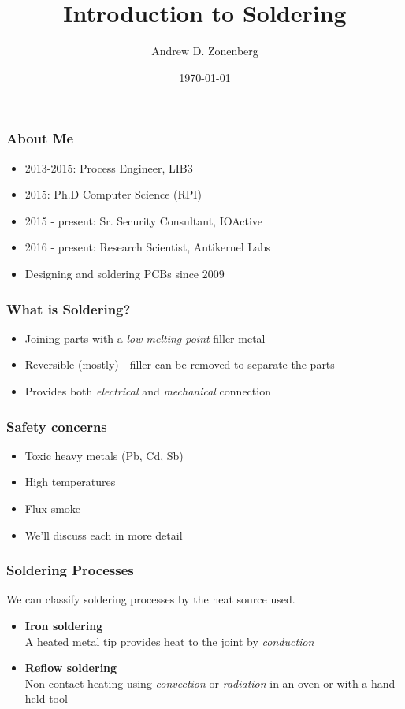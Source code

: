 \documentclass{beamer}
\title{Introduction to Soldering}
\author{Andrew D. Zonenberg}
\institute{Antikernel Labs}
\date{\today}
\begin{document}
\frame{\titlepage}

\begin{frame}
\frametitle{About Me}

\begin{itemize}
\item 2013-2015: Process Engineer, LIB3
\item 2015: Ph.D Computer Science (RPI)
\item 2015 - present: Sr. Security Consultant, IOActive
\item 2016 - present: Research Scientist, Antikernel Labs
\item Designing and soldering PCBs since 2009
\end{itemize}
\end{frame}

\begin{frame}
\frametitle{What is Soldering?}
\begin{itemize}
\item Joining parts with a \emph{low melting point} filler metal
\item Reversible (mostly) - filler can be removed to separate the parts
\item Provides both \emph{electrical} and \emph{mechanical} connection
\end{itemize}
\end{frame}

\begin{frame}
\frametitle{Safety concerns}
\begin{itemize}
\item Toxic heavy metals (Pb, Cd, Sb)
\item High temperatures
\item Flux smoke
\item We'll discuss each in more detail
\end{itemize}
\end{frame}

\begin{frame}
\frametitle{Soldering Processes}
We can classify soldering processes by the heat source used.
\begin{itemize}
\item \textbf{Iron soldering} \\
A heated metal tip provides heat to the joint by \emph{conduction}
\item \textbf{Reflow soldering} \\
Non-contact heating using \emph{convection} or \emph{radiation} in an oven or with a hand-held tool
\end{itemize}
\end{frame}
\end{document}
